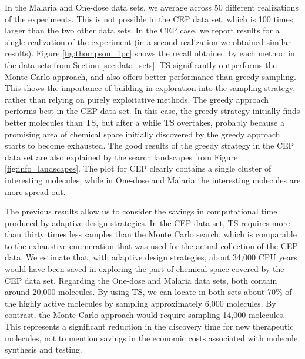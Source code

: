 In the Malaria and One-dose data sets, we average across 50 different realizations of the experiments. This is not possible in the CEP data set, which is 100 times larger than the two other data sets. In the CEP case, we report results for a single realization of the experiment (in a second realization we obtained similar results). 
Figure \ref{fig:thompson_1pc} shows the recall obtained by each method in the data sets from 
Section \ref{sec:data_sets}. TS significantly outperforms the Monte Carlo approach, and also offers better performance than greedy sampling. This shows the importance of building in exploration into the sampling strategy, rather than relying on purely exploitative methods. The greedy approach performs best in the CEP data set. In this case, the greedy strategy initially finds better molecules than TS, but after a while TS overtakes, probably because a promising area of chemical space 
initially discovered by the greedy approach starts to become exhausted. The good results of the greedy strategy in the CEP data set are also explained by the search landscapes from Figure \ref{fig:info_landscapes}. The plot for CEP clearly contains a single cluster of interesting molecules, while in One-dose and Malaria the interesting molecules are more spread out.

The previous results allow us to consider the savings in computational time produced by adaptive design strategies. In the CEP data set, TS requires more than thirty times less samples than the Monte Carlo search, which is comparable to the exhaustive enumeration that was used for the actual collection of the CEP data. We estimate that, with adaptive design strategies, about 34,000 CPU years would have been saved in exploring the part of chemical space covered by the CEP data set. Regarding the One-dose and Malaria data sets, both contain around 20,000 molecules. By using TS, we can locate in both sets about 70\% of the highly active molecules by sampling approximately 6,000 molecules. By contrast, the Monte Carlo approach would require sampling 14,000 molecules. This represents a significant reduction in the discovery time for new therapeutic molecules, not to mention savings in the economic costs associated with molecule synthesis and testing.

